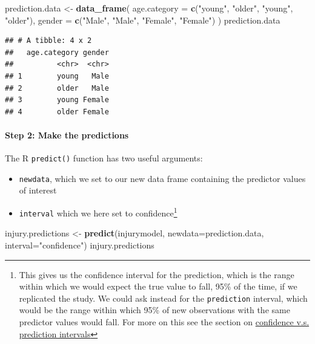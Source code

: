 \documentclass[]{article}
\newenvironment{Shaded}{\begin{snugshade}}{\end{snugshade}}
\newcommand{\KeywordTok}[1]{\textcolor[rgb]{0.13,0.29,0.53}{\textbf{#1}}}
\newcommand{\DataTypeTok}[1]{\textcolor[rgb]{0.13,0.29,0.53}{#1}}
\newcommand{\StringTok}[1]{\textcolor[rgb]{0.31,0.60,0.02}{#1}}
\newcommand{\NormalTok}[1]{#1}
\providecommand{\tightlist}{%
  \setlength{\itemsep}{0pt}\setlength{\parskip}{0pt}}
\let\oldparagraph\paragraph
\renewcommand{\paragraph}[1]{\oldparagraph{#1}\mbox{}}
\let\rmarkdownfootnote\footnote%
\def\footnote{\protect\rmarkdownfootnote}
\theoremstyle{definition}
\theoremstyle{definition}
\theoremstyle{definition}
\theoremstyle{remark}
\begin{document}
\begin{Shaded}
\begin{Highlighting}[]
\NormalTok{prediction.data <-}\StringTok{ }\KeywordTok{data_frame}\NormalTok{(}
  \DataTypeTok{age.category =} \KeywordTok{c}\NormalTok{(}\StringTok{"young"}\NormalTok{, }\StringTok{"older"}\NormalTok{, }\StringTok{"young"}\NormalTok{, }\StringTok{"older"}\NormalTok{),}
  \DataTypeTok{gender =} \KeywordTok{c}\NormalTok{(}\StringTok{"Male"}\NormalTok{, }\StringTok{"Male"}\NormalTok{, }\StringTok{"Female"}\NormalTok{, }\StringTok{"Female"}\NormalTok{)}
\NormalTok{)}
\NormalTok{prediction.data}
\end{Highlighting}
\end{Shaded}

\begin{verbatim}
## # A tibble: 4 x 2
##   age.category gender
##          <chr>  <chr>
## 1        young   Male
## 2        older   Male
## 3        young Female
## 4        older Female
\end{verbatim}

\paragraph{Step 2: Make the
predictions}\label{step-2-make-the-predictions}

The R \texttt{predict()} function has two useful arguments:

\begin{itemize}
\tightlist
\item
  \texttt{newdata}, which we set to our new data frame containing the
  predictor values of interest
\item
  \texttt{interval} which we here set to confidence\footnote{This gives
    us the confidence interval for the prediction, which is the range
    within which we would expect the true value to fall, 95\% of the
    time, if we replicated the study. We could ask instead for the
    \texttt{prediction} interval, which would be the range within which
    95\% of new observations with the same predictor values would fall.
    For more on this see the section on
    \href{confidence-vs-prediction-intervals.html}{confidence v.s.
    prediction intervals}}
\end{itemize}

\begin{Shaded}
\begin{Highlighting}[]
\NormalTok{injury.predictions <-}\StringTok{ }\KeywordTok{predict}\NormalTok{(injurymodel, }\DataTypeTok{newdata=}\NormalTok{prediction.data, }\DataTypeTok{interval=}\StringTok{"confidence"}\NormalTok{)}
\NormalTok{injury.predictions}
\end{Highlighting}
\end{Shaded}
\end{document}

